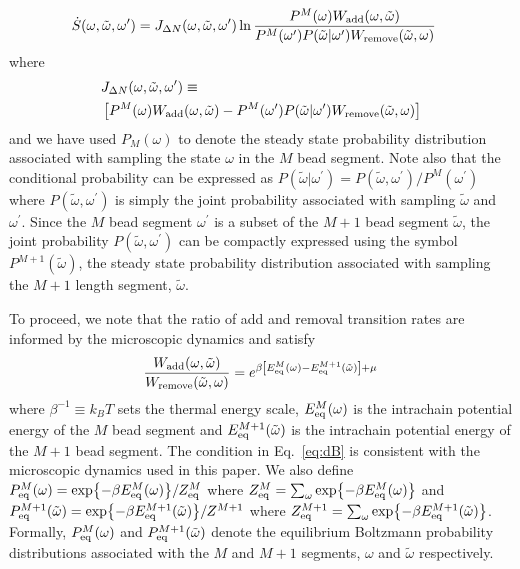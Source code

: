 \documentclass[amsmath,preprintnumbers,10pt,nofootinbib,prl,twocolumn]{revtex4-1}
\begin{document}
\begin{equation}
\label{eq:entprod}
\begin{split}
    &
    \dot{S}(\omega,\tilde\omega,\omega^\prime)=J_{\Delta N}(\omega,\tilde\omega,\omega^\prime)\ln\frac{P^M(\omega)W_{\rm add}(\omega,\tilde\omega)}{P^M(\omega^\prime)P(\tilde\omega|\omega^\prime)W_{\rm remove}(\tilde \omega,\omega)}
\end{split}
\end{equation}
where
\begin{equation}
\begin{split}
    &J_{\Delta N}(\omega,\tilde\omega,\omega^\prime)\equiv\\& \left[P^M(\omega)W_{\rm add}(\omega,\tilde\omega)-P^M(\omega^\prime)P(\tilde\omega|\omega^\prime)W_{\rm remove}(\tilde \omega,\omega)\right]
\end{split}
\end{equation}
and we have used $P_M(\omega)$ to denote the steady state probability distribution associated with sampling the state $\omega$ in the $M$ bead segment. Note also that the conditional probability can be expressed as $P(\tilde \omega|\omega^\prime)=P(\tilde \omega,\omega^\prime)/P^M(\omega^\prime)$ where $P(\tilde \omega,\omega^\prime)$ is simply the joint probability associated with sampling $\tilde \omega$ and $\omega^\prime$. Since the $M$ bead segment $\omega^\prime$ is a subset of the $M+1$ bead segment $\tilde\omega$, the joint probability $P(\tilde \omega,\omega^\prime)$ can be compactly expressed using the symbol $P^{M+1}(\tilde \omega)$, the steady state probability distribution associated with sampling the $M+1$ length segment, $\tilde \omega$. 

To proceed, we note that the ratio of add and removal transition rates are informed by the microscopic dynamics and satisfy 
\begin{equation}
\label{eq:dB}
    \frac{W_{\rm add}(\omega,\tilde\omega)}{W_{\rm remove}(\tilde \omega,\omega)}=e^{\beta\left[E^M_{\rm{eq}}(\omega)-E^{M+1}_{\rm{eq}}(\tilde\omega)\right]+\mu}
\end{equation}
where $\beta^{-1}\equiv k_B T$ sets the thermal energy scale, $E^M_{\rm{eq}}(\omega)$ is the intrachain potential energy of the $M$ bead segment and $E^{M+1}_{\rm{eq}}(\tilde \omega)$ is the intrachain potential energy of the $M+1$ bead segment. The condition in Eq.~\ref{eq:dB} is consistent with the microscopic dynamics used in this paper. We also define $P_{\rm eq}^{M}(\omega)=\exp{-\beta E^M_{\rm{eq}}(\omega)}/Z^M_{\rm eq}$ where $Z^M_{\rm eq}=\sum_{\omega}\exp{-\beta E^M_{\rm{eq}}(\omega)}$ and $P_{\rm eq}^{M+1}(\tilde \omega)=\exp{-\beta E_{\rm eq}^{M+1}(\tilde\omega)}/Z^{M+1}$ where $Z^{M+1}_{\rm eq}=\sum_{\omega}\exp{-\beta E^{M+1}_{\rm eq}(\tilde \omega)}$. Formally, $P_{\rm eq}^M(\omega)$ and $P_{\rm eq}^{M+1}(\tilde \omega)$ denote the equilibrium Boltzmann probability distributions associated with the $M$ and $M+1$ segments, $\omega$ and $\tilde\omega$ respectively. 
\end{document}
